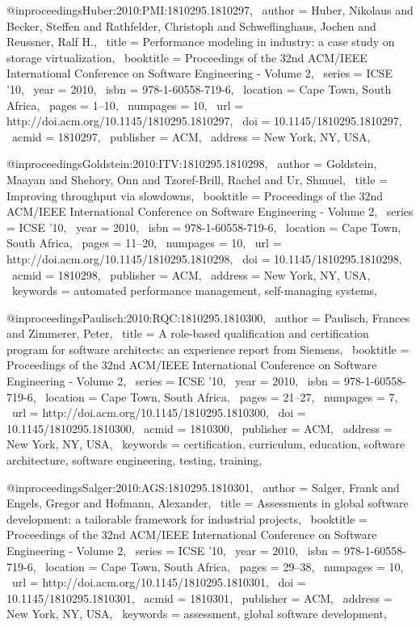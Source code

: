 @inproceedings{Huber:2010:PMI:1810295.1810297,
 author = {Huber, Nikolaus and Becker, Steffen and Rathfelder, Christoph and Schweflinghaus, Jochen and Reussner, Ralf H.},
 title = {Performance modeling in industry: a case study on storage virtualization},
 booktitle = {Proceedings of the 32nd ACM/IEEE International Conference on Software Engineering - Volume 2},
 series = {ICSE '10},
 year = {2010},
 isbn = {978-1-60558-719-6},
 location = {Cape Town, South Africa},
 pages = {1--10},
 numpages = {10},
 url = {http://doi.acm.org/10.1145/1810295.1810297},
 doi = {10.1145/1810295.1810297},
 acmid = {1810297},
 publisher = {ACM},
 address = {New York, NY, USA},
} 

@inproceedings{Goldstein:2010:ITV:1810295.1810298,
 author = {Goldstein, Maayan and Shehory, Onn and Tzoref-Brill, Rachel and Ur, Shmuel},
 title = {Improving throughput via slowdowns},
 booktitle = {Proceedings of the 32nd ACM/IEEE International Conference on Software Engineering - Volume 2},
 series = {ICSE '10},
 year = {2010},
 isbn = {978-1-60558-719-6},
 location = {Cape Town, South Africa},
 pages = {11--20},
 numpages = {10},
 url = {http://doi.acm.org/10.1145/1810295.1810298},
 doi = {10.1145/1810295.1810298},
 acmid = {1810298},
 publisher = {ACM},
 address = {New York, NY, USA},
 keywords = {automated performance management, self-managing systems},
} 

@inproceedings{Paulisch:2010:RQC:1810295.1810300,
 author = {Paulisch, Frances and Zimmerer, Peter},
 title = {A role-based qualification and certification program for software architects: an experience report from Siemens},
 booktitle = {Proceedings of the 32nd ACM/IEEE International Conference on Software Engineering - Volume 2},
 series = {ICSE '10},
 year = {2010},
 isbn = {978-1-60558-719-6},
 location = {Cape Town, South Africa},
 pages = {21--27},
 numpages = {7},
 url = {http://doi.acm.org/10.1145/1810295.1810300},
 doi = {10.1145/1810295.1810300},
 acmid = {1810300},
 publisher = {ACM},
 address = {New York, NY, USA},
 keywords = {certification, curriculum, education, software architecture, software engineering, testing, training},
} 

@inproceedings{Salger:2010:AGS:1810295.1810301,
 author = {Salger, Frank and Engels, Gregor and Hofmann, Alexander},
 title = {Assessments in global software development: a tailorable framework for industrial projects},
 booktitle = {Proceedings of the 32nd ACM/IEEE International Conference on Software Engineering - Volume 2},
 series = {ICSE '10},
 year = {2010},
 isbn = {978-1-60558-719-6},
 location = {Cape Town, South Africa},
 pages = {29--38},
 numpages = {10},
 url = {http://doi.acm.org/10.1145/1810295.1810301},
 doi = {10.1145/1810295.1810301},
 acmid = {1810301},
 publisher = {ACM},
 address = {New York, NY, USA},
 keywords = {assessment, global software development},
} 


